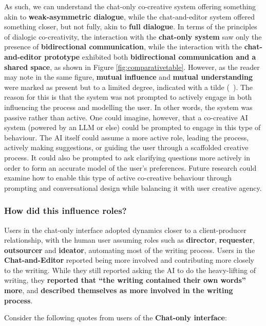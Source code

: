 As such, we can understand the chat-only co-creative system offering something akin to \textbf{weak-asymmetric dialogue}, while the chat-and-editor system offered something closer, but not fully, akin to \textbf{full dialogue}. In terms of the principles of dialogic co-creativity, the interaction with the \textbf{chat-only system} saw only the presence of \textbf{bidirectional communication}, while the interaction with the \textbf{chat-and-editor prototype} exhibited both \textbf{bidirectional communication and a shared space}, as shown in Figure \ref{fig:comparativetable}. However, as the reader may note in the same figure, \textbf{mutual influence} and \textbf{mutual understanding} were marked as present but to a limited degree, indicated with a tilde (\string~). The reason for this is that the system was not prompted to actively engage in both influencing the process and modelling the user. In other words, the system was passive rather than active. One could imagine, however, that a co-creative AI system (powered by an LLM or else) could be prompted to engage in this type of behaviour. The AI itself could assume a more active role, leading the process, actively making suggestions, or guiding the user through a scaffolded creative process. It could also be prompted to ask clarifying questions more actively in order to form an accurate model of the user's preferences. Future research could examine how to enable this type of active co-creative behaviour through prompting and conversational design while balancing it with user creative agency.

\subsubsection{How did this influence roles?}

Users in the chat-only interface adopted dynamics closer to a client-producer relationship, with the human user assuming roles such as \textbf{director}, \textbf{requester}, \textbf{outsourcer} and \textbf{ideator}, automating most of the writing process. Users in the \textbf{Chat-and-Editor} reported being more involved and contributing more closely to the writing. While they still reported asking the AI to do the heavy-lifting of writing, they \textbf{reported that ``the writing contained their own words'' more}, and \textbf{described themselves as more involved in the writing process}. 

Consider the following quotes from users of the \textbf{Chat-only interface}:

